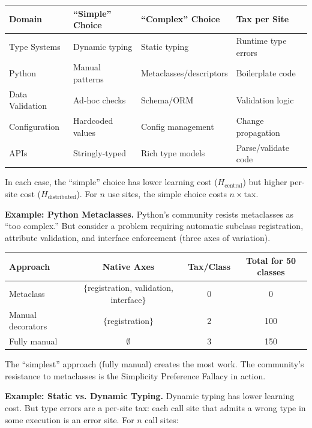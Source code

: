 \begin{center}
\begin{tabular}{p{2.2cm}p{3.5cm}p{3.5cm}p{3cm}}
\toprule
\textbf{Domain} & \textbf{``Simple'' Choice} & \textbf{``Complex'' Choice} & \textbf{Tax per Site} \\
\midrule
Type Systems & Dynamic typing & Static typing & Runtime type errors \\
Python & Manual patterns & Metaclasses/descriptors & Boilerplate code \\
Data Validation & Ad-hoc checks & Schema/ORM & Validation logic \\
Configuration & Hardcoded values & Config management & Change propagation \\
APIs & Stringly-typed & Rich type models & Parse/validate code \\
\bottomrule
\end{tabular}
\end{center}

In each case, the ``simple'' choice has lower learning cost ($H_{\text{central}}$) but higher per-site cost ($H_{\text{distributed}}$). For $n$ use sites, the simple choice costs $n \times \text{tax}$.



\textbf{Example: Python Metaclasses.} Python's community resists metaclasses as ``too complex.'' But consider a problem requiring automatic subclass registration, attribute validation, and interface enforcement (three axes of variation).

\begin{center}
\begin{tabular}{lccc}
\toprule
\textbf{Approach} & \textbf{Native Axes} & \textbf{Tax/Class} & \textbf{Total for 50 classes} \\
\midrule
Metaclass & $\{$registration, validation, interface$\}$ & 0 & 0 \\
Manual decorators & $\{$registration$\}$ & 2 & 100 \\
Fully manual & $\emptyset$ & 3 & 150 \\
\bottomrule
\end{tabular}
\end{center}

The ``simplest'' approach (fully manual) creates the most work. The community's resistance to metaclasses is the Simplicity Preference Fallacy in action.

\textbf{Example: Static vs. Dynamic Typing.} Dynamic typing has lower learning cost. But type errors are a per-site tax: each call site that admits a wrong type in some execution is an error site. For $n$ call sites:

